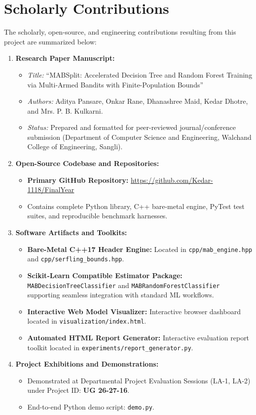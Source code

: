 \documentclass{article}
\begin{document}
	\section{Scholarly Contributions}
	The scholarly, open-source, and engineering contributions resulting from this project are summarized below:
	\begin{enumerate}
		\item \textbf{Research Paper Manuscript:}
		\begin{itemize}
			\item \textit{Title:} ``MABSplit: Accelerated Decision Tree and Random Forest Training via Multi-Armed Bandits with Finite-Population Bounds''
			\item \textit{Authors:} Aditya Pansare, Onkar Rane, Dhanashree Maid, Kedar Dhotre, and Mrs. P. B. Kulkarni.
			\item \textit{Status:} Prepared and formatted for peer-reviewed journal/conference submission (Department of Computer Science and Engineering, Walchand College of Engineering, Sangli).
		\end{itemize}
		\item \textbf{Open-Source Codebase and Repositories:}
		\begin{itemize}
			\item \textbf{Primary GitHub Repository:} \url{https://github.com/Kedar-1118/FinalYear}
			\item Contains complete Python library, C++ bare-metal engine, PyTest test suites, and reproducible benchmark harnesses.
		\end{itemize}
		\item \textbf{Software Artifacts and Toolkits:}
		\begin{itemize}
			\item \textbf{Bare-Metal C++17 Header Engine:} Located in \texttt{cpp/mab\_engine.hpp} and \texttt{cpp/serfling\_bounds.hpp}.
			\item \textbf{Scikit-Learn Compatible Estimator Package:} \texttt{MABDecisionTreeClassifier} and \texttt{MABRandomForestClassifier} supporting seamless integration with standard ML workflows.
			\item \textbf{Interactive Web Model Visualizer:} Interactive browser dashboard located in \texttt{visualization/index.html}.
			\item \textbf{Automated HTML Report Generator:} Interactive evaluation report toolkit located in \texttt{experiments/report\_generator.py}.
		\end{itemize}
		\item \textbf{Project Exhibitions and Demonstrations:}
		\begin{itemize}
			\item Demonstrated at Departmental Project Evaluation Sessions (LA-1, LA-2) under Project ID: \textbf{UG 26-27-16}.
			\item End-to-end Python demo script: \texttt{demo.py}.
		\end{itemize}
	\end{enumerate}
\end{document}
